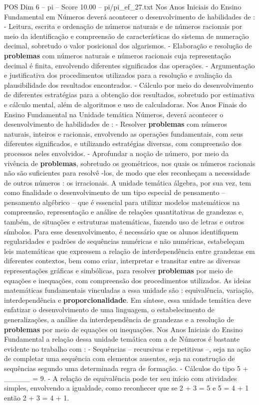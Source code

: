 \begin{textsample}{POS Dim 6 – pi – Score 10.00 – pi/pi\_ef\_27.txt}
Nos Anos Iniciais do Ensino Fundamental em Números deverá acontecer o desenvolvimento de habilidades de : - Leitura, escrita e ordenação de números naturais e de números racionais por meio da identificação e compreensão de características do sistema de numeração decimal, sobretudo o valor posicional dos algarismos. - Elaboração e resolução de \textbf{problemas} com números naturais e números racionais cuja representação decimal é finita, envolvendo diferentes significados das operações. - Argumentação e justificativa dos procedimentos utilizados para a resolução e avaliação da plausibilidade dos resultados encontrados. - Cálculo por meio do desenvolvimento de diferentes estratégias para a obtenção dos resultados, sobretudo por estimativa e cálculo mental, além de algoritmos e uso de calculadoras.
Nos Anos Finais do Ensino Fundamental na Unidade temática Números, deverá acontecer o desenvolvimento de habilidades de : - Resolver \textbf{problemas} com números naturais, inteiros e racionais, envolvendo as operações fundamentais, com seus diferentes significados, e utilizando estratégias diversas, com compreensão dos processos neles envolvidos. - Aprofundar a noção de número, por meio da vivência de \textbf{problemas}, sobretudo os geométricos, nos quais os números racionais não são suficientes para resolvê -los, de modo que eles reconheçam a necessidade de outros números : os irracionais.
A unidade temática álgebra, por sua vez, tem como finalidade o desenvolvimento de um tipo especial de pensamento – pensamento algébrico – que é essencial para utilizar modelos matemáticos na compreensão, representação e análise de relações quantitativas de grandezas e, também, de situações e estruturas matemáticas, fazendo uso de letras e outros símbolos.
Para esse desenvolvimento, é necessário que os alunos identifiquem regularidades e padrões de sequências numéricas e não numéricas, estabeleçam leis matemáticas que expressem a relação de interdependência entre grandezas em diferentes contextos, bem como criar, interpretar e transitar entre as diversas representações gráficas e simbólicas, para resolver \textbf{problemas} por meio de equações e inequações, com compreensão dos procedimentos utilizados.
As ideias matemáticas fundamentais vinculadas a essa unidade são : equivalência, variação, interdependência e \textbf{proporcionalidade}.
Em síntese, essa unidade temática deve enfatizar o desenvolvimento de uma linguagem, o estabelecimento de generalizações, a análise da interdependência de grandezas e a resolução de \textbf{problemas} por meio de equações ou inequações.
Nos Anos Iniciais do Ensino Fundamental a relação dessa unidade temática com a de Números é bastante evidente no trabalho com : - Sequências – recursivas e repetitivas –, seja na ação de completar uma sequência com elementos ausentes, seja na construção de sequências segundo uma determinada regra de formação. - Cálculos do tipo 5 + \_\_\_\_\_ = 9. - A relação de equivalência pode ter seu início com atividades simples, envolvendo a igualdade, como reconhecer que se 2 + 3 = 5 e 5 = 4 + 1 então 2 + 3 = 4 + 1.

\end{textsample}
